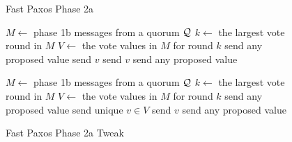 \begin{figure}[ht]
  \begin{minipage}[t]{0.48\textwidth}
    \begin{algorithm}[H]
      \caption{Fast Paxos Phase 2a}%
      \begin{algorithmic}[1]
        \State $M \gets$ phase 1b messages from a quorum $\mathcal{Q}$
        \State $k \gets$ the largest vote round in $M$
        \State $V \gets$ the vote values in $M$ for round $k$
          \State send any proposed value 
          \State send $v$ 
          \State send $v$ 
        \Else{}
          \State send any proposed value 
        \EndIf{}
      \end{algorithmic}
    \end{algorithm}
  \end{minipage}%
  \hspace{0.04\textwidth}%
  \begin{minipage}[t]{0.48\textwidth}
    \begin{algorithm}[H]
      \caption{Fast Paxos Phase 2a Tweak}%
      \begin{algorithmic}[1]
        \State $M \gets$ phase 1b messages from a quorum $\mathcal{Q}$
        \State $k \gets$ the largest vote round in $M$
        \State $V \gets$ the vote values in $M$ for round $k$
          \State send any proposed value 
          \State send unique $v \in V$ 
          \State send $v$ 
        \Else{}
          \State send any proposed value 
        \EndIf{}
      \end{algorithmic}
    \end{algorithm}
  \end{minipage}
\end{figure}

